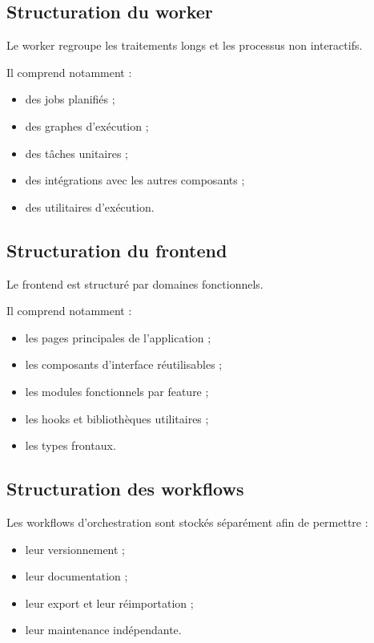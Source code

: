 \documentclass[11pt,a4paper]{article}
\begin{document}
\subsection{Structuration du worker}

Le worker regroupe les traitements longs et les processus non interactifs.

Il comprend notamment :

\begin{itemize}
    \item des jobs planifiés ;
    \item des graphes d’exécution ;
    \item des tâches unitaires ;
    \item des intégrations avec les autres composants ;
    \item des utilitaires d’exécution.
\end{itemize}

\subsection{Structuration du frontend}

Le frontend est structuré par domaines fonctionnels.

Il comprend notamment :

\begin{itemize}
    \item les pages principales de l’application ;
    \item les composants d’interface réutilisables ;
    \item les modules fonctionnels par feature ;
    \item les hooks et bibliothèques utilitaires ;
    \item les types frontaux.
\end{itemize}

\subsection{Structuration des workflows}

Les workflows d’orchestration sont stockés séparément afin de permettre :

\begin{itemize}
    \item leur versionnement ;
    \item leur documentation ;
    \item leur export et leur réimportation ;
    \item leur maintenance indépendante.
\end{itemize}
\end{document}
